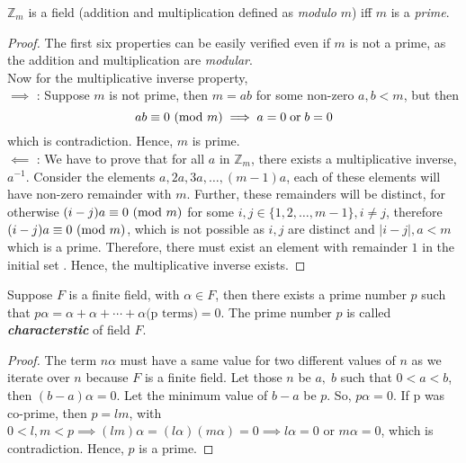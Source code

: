 \documentclass[../main.tex]{subfiles}
\begin{document}
	\begin{thm}
	$\mathbb{Z}_m$ is a field (addition and multiplication defined as \emph{modulo} $m$) iff $m$ is a \emph{prime}.
	\end{thm}
	\begin{proof}
		The first six properties can be easily verified even if $m$ is not a prime, as the addition and multiplication are \emph{modular}.\\
		Now for the multiplicative inverse property,\\
		$\implies$ : Suppose $m$ is not prime, then $m=ab$ for some non-zero $a,b<m$, 
		but then 
		\[
			ab\equiv 0\ (\mathrm{mod}\ m) \implies a=0\;\text{or}\;b=0	
		\] which is contradiction. Hence, $m$ is prime.\\
		$\impliedby$ : We have to prove that for all $a$ in $\mathbb{Z}_m$, there exists a multiplicative inverse, $a^{-1}$. Consider the elements $a, 2a, 3a,\ldots, (m-1)a$, each of these elements will have non-zero remainder with $m$. Further, these remainders will be distinct, for otherwise $(i-j)a\equiv 0\ (\mathrm{mod}\ m)$ for some $i,j \in \{1,2,\ldots,m-1\}, i\neq j$, therefore $(i-j)a\equiv 0\ (\mathrm{mod}\ m)$, which is not possible as $i,j$ are distinct and $|i-j|,a < m$ which is a prime. Therefore, there must exist an element with remainder $1$ in the initial set	. Hence, the multiplicative inverse exists. 
	\end{proof}
	\begin{thm}
	Suppose $F$ is a finite field, with $\alpha \in F$, then there exists a prime number $p$ such that $p\alpha = \alpha+\alpha+\cdots +\alpha\text{(p terms)} = 0$. The prime number $p$ is called \textbf{\emph{characterstic}} of field $F$.
	\end{thm}
	\begin{proof}
		The term $n\alpha$ must have a same value for two different values of $n$ as we iterate over $n$ because $F$ is a finite field. Let those $n$ be $a,\;b$ such that $0<a<b$, then $(b-a)\alpha = 0$. Let the minimum value of $b-a$ be $p$. So, $p\alpha = 0$. If p was co-prime, then $p=lm$, with $0<l,m<p \implies (lm)\alpha=(l\alpha)(m\alpha)=0 \implies l\alpha=0 $ or $m\alpha=0$, which is contradiction. Hence, $p$ is a prime. 
	\end{proof}
				
\end{document}
